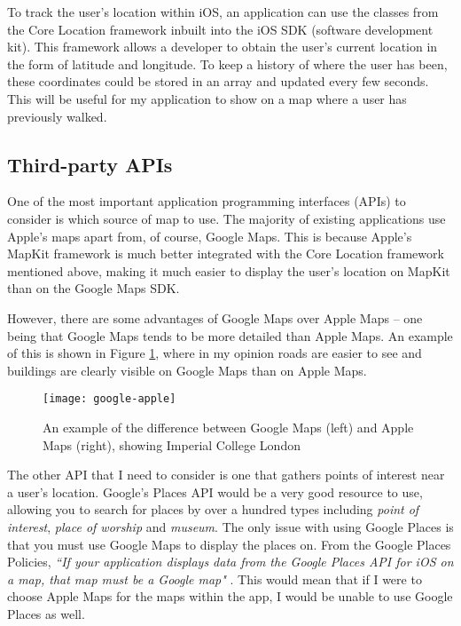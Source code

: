 To track the user's location within iOS, an application can use the classes from the Core Location framework \cite{AppleInc.} inbuilt into the iOS SDK (software development kit). This framework allows a developer to obtain the user's current location in the form of latitude and longitude. To keep a history of where the user has been, these coordinates could be stored in an array and updated every few seconds. This will be useful for my application to show on a map where a user has previously walked.


\subsection{Third-party APIs} \label{subsection:background-apis}

One of the most important application programming interfaces (APIs) to consider is which source of map to use. The majority of existing applications use Apple's maps apart from, of course, Google Maps. This is because Apple's MapKit framework \cite{AppleInc.a} is much better integrated with the Core Location framework mentioned above, making it much easier to display the user's location on MapKit than on the Google Maps SDK.

However, there are some advantages of Google Maps over Apple Maps -- one being that Google Maps tends to be more detailed than Apple Maps. An example of this is shown in Figure \ref{fig:google-apple}, where in my opinion roads are easier to see and buildings are clearly visible on Google Maps than on Apple Maps.

\begin{figure}[hbt]
  \centering
  \texttt{[image: google-apple]}
  \caption{An example of the difference between Google Maps (left) and Apple Maps (right), showing Imperial College London}
  \label{fig:google-apple}
\end{figure}

The other API that I need to consider is one that gathers points of interest near a user's location. Google's Places API \cite{GoogleInc.b} would be a very good resource to use, allowing you to search for places by over a hundred types including \textit{point of interest}, \textit{place of worship} and \textit{museum}. The only issue with using Google Places is that you must use Google Maps to display the places on. From the Google Places Policies, \textit{``If your application displays data from the Google Places API for iOS on a map, that map must be a Google map"} \cite{GoogleInc.c}. This would mean that if I were to choose Apple Maps for the maps within the app, I would be unable to use Google Places as well.

